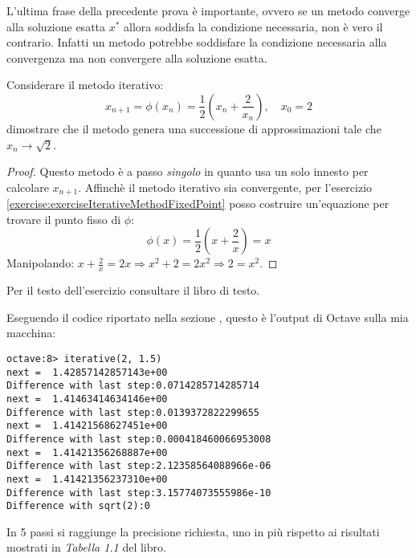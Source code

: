 \begin{oss}
L'ultima frase della precedente prova \`e importante, ovvero se un metodo
converge alla soluzione esatta $x^{*}$ allora soddisfa la condizione necessaria,
non \`e vero il contrario. Infatti un metodo potrebbe soddisfare la condizione
necessaria alla convergenza ma non convergere alla soluzione esatta.
\end{oss}

\begin{exercise}
Considerare il metodo iterativo:
\begin{displaymath}
	x_{n+1} = \phi(x_{n}) = \frac{1}{2} \left ( x_{n} + \frac{2}{x_{n}} \right ), 
		\quad x_{0} = 2
\end{displaymath}
dimostrare che il metodo genera una successione di approssimazioni tale che 
$x_{n} \rightarrow \sqrt{2}$.
\end{exercise}
\begin{proof}
Questo metodo \`e a passo \emph{singolo} in quanto usa un solo innesto per calcolare
$x_{n + 1}$.
Affinch\`e il metodo iterativo sia convergente, per l'esercizio 
\ref{exercise:exerciseIterativeMethodFixedPoint} posso costruire
un'equazione per trovare il punto fisso di $\phi$:
\begin{displaymath}
	\phi(x) =  \frac{1}{2} \left ( x + \frac{2}{x} \right ) = x 
\end{displaymath}
Manipolando: $x + \frac{2}{x} = 2x \Rightarrow x^{2} + 2 = 2x^{2} \Rightarrow 
	2 = x^{2}$.
\end{proof}

\begin{exercise}[1.4] Per il testo dell'esercizio consultare il libro di testo.
\end{exercise}
Eseguendo il codice riportato nella sezione , 
questo \`e l'output di Octave sulla mia macchina:
\begin{lstlisting}
octave:8> iterative(2, 1.5)
next =  1.42857142857143e+00
Difference with last step:0.0714285714285714
next =  1.41463414634146e+00
Difference with last step:0.0139372822299655
next =  1.41421568627451e+00
Difference with last step:0.000418460066953008
next =  1.41421356268887e+00
Difference with last step:2.12358564088966e-06
next =  1.41421356237310e+00
Difference with last step:3.15774073555986e-10
Difference with sqrt(2):0
\end{lstlisting}
In 5 passi si raggiunge la precisione richiesta, uno in pi\`u rispetto ai risultati
mostrati in \emph{Tabella 1.1} del libro.



